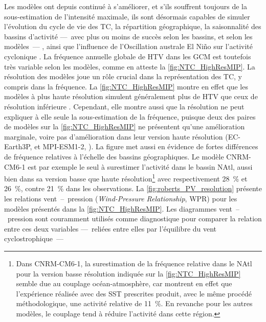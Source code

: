 \documentclass[../main.tex]{subfiles}
\begin{document}
Les modèles ont depuis continué à s'améliorer, et s'ils souffrent toujours de la sous-estimation de l'intensité maximale, ils sont désormais capables de simuler
l'évolution du cycle de vie des TC, la répartition géographique, la saisonnalité des bassins d'activité ---~avec plus ou moins de succès selon les bassins, et
selon les modèles~--- \parencite{bengtsson_tropical_2007,zhao_simulations_2009,shaevitz_characteristics_2014}, ainsi que l'influence de l'Oscillation australe
El Niño sur l'activité cyclonique \parencite{vitart_simulation_1997,gualdi_changes_2008,camargo_experimental_2009}. La fréquence annuelle globale de HTV dans
les GCM est toutefois très variable selon les modèles, comme en atteste la \cref{fig:NTC_HighResMIP}. La résolution des modèles joue un rôle crucial dans la
représentation des TC, y compris dans la fréquence. La \cref{fig:NTC_HighResMIP} montre en effet que les modèles à plus haute résolution simulent généralement
plus de HTV que ceux de résolution inférieure \parencite{camargo_global_2013,roberts_impact_2020}. Cependant, elle montre aussi que la résolution ne peut
expliquer à elle seule la sous-estimation de la fréquence, puisque deux des paires de modèles sur la \cref{fig:NTC_HighResMIP} ne présentent qu'une amélioration
marginale, voire pas d'amélioration dans leur version haute résolution (EC-Earth3P, \cite{haarsma_highresmip_2020} et MPI-ESM1-2, \cite{gutjahr_max_2019}). La
figure met aussi en évidence de fortes différences de fréquence relatives à l'échelle des bassins géographiques. Le modèle CNRM-CM6-1 est par exemple le seul à
surestimer l'activité dans le bassin NAtl, aussi bien dans sa version basse que haute résolution\footnote{Dans CNRM-CM6-1, la surestimation de la fréquence
relative dans le NAtl pour la version basse résolution indiquée sur la \cref{fig:NTC_HighResMIP} semble due au couplage océan-atmosphère, car
\textcite{roberts_impact_2020} montrent en effet que l'expérience réalisée avec des SST prescrites produit, avec le même procédé méthodologique, une activité
relative de \SI{11}{\percent}. En revanche pour les autres modèles, le couplage tend à réduire l'activité dans cette région.} avec respectivement
\SI{28}{\percent} et \SI{26}{\percent}, contre \SI{21}{\percent} dans les observations. La \cref{fig:roberts_PV_resolution} présente les relations
vent~--~pression (\textit{Wind-Pressure Relationship}, WPR) pour les modèles présentés dans la \cref{fig:NTC_HighResMIP}. Les diagrammes vent~--~pression sont
couramment utilisés comme diagnostique pour comparer la relation entre ces deux variables ---~reliées entre elles par l'équilibre du vent cyclostrophique~---
\end{document}
